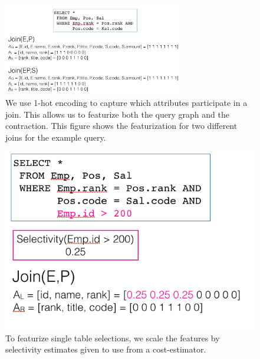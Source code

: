 \begin{figure}
    \centering
    \includegraphics[width=0.7\textwidth]{figs/featurization.png}
    \caption{We use 1-hot encoding to capture which attributes participate in a join. This allows us to featurize both the query graph and the contraction. This figure shows the featurization for two different joins for the example query.  \label{feat}}
\end{figure}

\begin{figure}
    \centering
    \includegraphics[width=0.8\columnwidth]{figs/selectivity.png}
    \caption{To featurize single table selections, we scale the features by selectivity estimates given to use from a cost-estimator.  \label{feat:sel}}
\end{figure}

